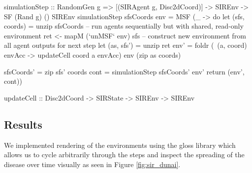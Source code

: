 \begin{HaskellCode}
simulationStep :: RandomGen g => [(SIRAgent g, Disc2dCoord)]
               -> SIREnv -> SF (Rand g) () SIREnv
simulationStep sfsCoords env = MSF (\_ -> do
  let (sfs, coords) = unzip sfsCoords 
  -- run agents sequentially but with shared, read-only environment
  ret <- mapM (`unMSF` env) sfs
  -- construct new environment from all agent outputs for next step
  let (as, sfs') = unzip ret
      env' = foldr (\ (a, coord) envAcc -> updateCell coord a envAcc) 
               env (zip as coords)

      sfsCoords' = zip sfs' coords
      cont       = simulationStep sfsCoords' env'
  return (env', cont))
 
updateCell :: Disc2dCoord -> SIRState -> SIREnv -> SIREnv
\end{HaskellCode}

\subsection{Results}
We implemented rendering of the environments using the gloss library which allows us to cycle arbitrarily through the steps and inspect the spreading of the disease over time visually as seen in Figure \ref{fig:sir_dunai}.

